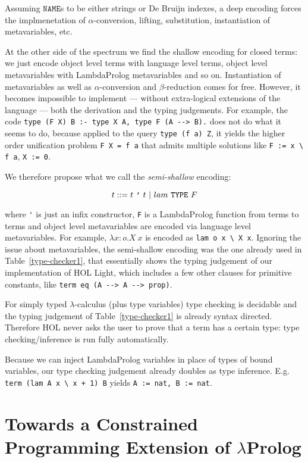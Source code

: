 \documentclass[preprint]{sigplanconf}
\begin{document}
Assuming $\mathtt{NAME}$s to be either strings or De Bruijn indexes, a deep encoding forces the implmenetation of $\alpha$-conversion, lifting, substitution, instantiation of metavariables, etc.

At the other side of the spectrum we find the shallow encoding for closed terms: we just encode object level terms with language level terms, object level metavariables with LambdaProlog metavariables and so on. Instantiation of metavariables as well as $\alpha$-conversion and $\beta$-reduction comes for free. However, it becomes impossible to implement --- without extra-logical extensions of the language --- both the derivation and the typing judgements. For example, the code
{\small \verb+type (F X) B :- type X A, type F (A --> B).+} does not do what it seems to
do, because applied to the query \verb+type (f a) Z+, it yields the higher order
unification problem \verb+F X = f a+ that admits multiple solutions like
\verb+F := x \ f a+, \verb+X := 0+.

We therefore propose what we call the \emph{semi-shallow} encoding:

$$t ::= t~\verb+'+~t ~|~ lam~\mathtt{TYPE}~F$$

where \verb+'+ is just an infix constructor, \verb+F+ is a LambdaProlog function from terms to terms and object level metavariables are encoded via language level metavariables. For example, $\lambda x\!:\!o. X~x$ is encoded as
\verb+lam o x \ X x+. Ignoring the issue about metavariables, the semi-shallow encoding was the one already used in Table~\ref{type-checker1}, that essentially shows the typing judgement of our implementation of HOL Light, which includes a few other clauses for primitive constants, like \verb+term eq (A --> A --> prop)+.

For simply typed $\lambda$-calculus (plus type variables) type checking is decidable and the typing judgement of Table~\ref{type-checker1} is already syntax directed. Therefore HOL never asks the user to prove that a term has a certain type: type checking/inference is run fully automatically.

Because we can inject LambdaProlog variables in place of types of bound variables, our type checking judgement already doubles as type inference. E.g. \verb/term (lam A x \ x + 1) B/ yields \verb+A := nat, B := nat+.

\section{Towards a Constrained Programming Extension of $\lambda$Prolog}
\label{cholp}
\end{document}
